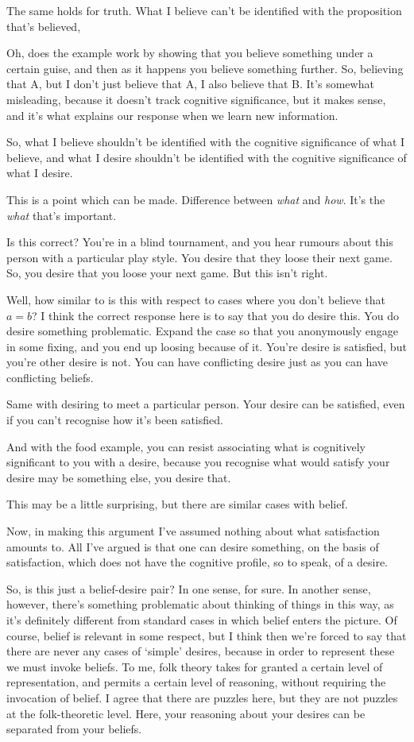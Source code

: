\documentclass[10pt]{article}
\begin{document}
The same holds for truth.
What I believe can't be identified with the proposition that's believed,



Oh, does the example work by showing that you believe something under a certain guise, and then as it happens you believe something further.
So, believing that A, but I don't just believe that A, I also believe that B.
It's somewhat misleading, because it doesn't track cognitive significance, but it makes sense, and it's what explains our response when we learn new information.

So, what I believe shouldn't be identified with the cognitive significance of what I believe, and what I desire shouldn't be identified with the cognitive significance of what I desire.

This is a point which can be made.
Difference between \emph{what} and \emph{how}.
It's the \emph{what} that's important.

Is this correct?
You're in a blind tournament, and you hear rumours about this person with a particular play style.
You desire that they loose their next game.
So, you desire that you loose your next game.
But this isn't right.

Well, how similar to is this with respect to cases where you don't believe that \(a = b\)?
I think the correct response here is to say that you do desire this.
You do desire something problematic.
Expand the case so that you anonymously engage in some fixing, and you end up loosing because of it.
You're desire is satisfied, but you're other desire is not.
You can have conflicting desire just as you can have conflicting beliefs.

Same with desiring to meet a particular person.
Your desire can be satisfied, even if you can't recognise how it's been satisfied.

And with the food example, you can resist associating what is cognitively significant to you with a desire, because you recognise what would satisfy your desire may be something else, you desire that.

This may be a little surprising, but there are similar cases with belief.

Now, in making this argument I've assumed nothing about what satisfaction amounts to.
All I've argued is that one can desire something, on the basis of satisfaction, which does not have the cognitive profile, so to speak, of a desire.

So, is this just a belief-desire pair?
In one sense, for sure.
In another sense, however, there's something problematic about thinking of things in this way, as it's definitely different from standard cases in which belief enters the picture.
Of course, belief is relevant in some respect, but I think then we're forced to say that there are never any cases of `simple' desires, because in order to represent these we must invoke beliefs.
To me, folk theory takes for granted a certain level of representation, and permits a certain level of reasoning, without requiring the invocation of belief.
I agree that there are puzzles here, but they are not puzzles at the folk-theoretic level.
Here, your reasoning about your desires can be separated from your beliefs.
\end{document}
